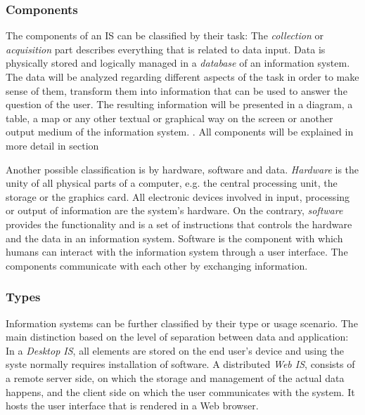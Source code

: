 \subsubsection{Components} %
\label{ssub:components_is}


The components of an IS can be classified by their task: The \emph{collection} or \emph{acquisition} part describes everything that is related to data input. Data is physically stored and logically managed in a \emph{database} of an information system. The data will be analyzed regarding different aspects of the task in order to make sense of them, transform them into information that can be used to answer the question of the user. The resulting information will be presented in a diagram, a table, a map or any other textual or graphical way on the screen or another output medium of the information system.
\cite{informationSystem}.
All components will be explained in more detail in section %

Another possible classification is by hardware, software and data. \emph{Hardware} is the unity of all physical parts of a computer, e.g. the central processing unit, the storage or the graphics card. All electronic devices involved in input, processing or output of information are the system's hardware. On the contrary, \emph{software} provides the functionality and is a set of instructions that controls the hardware and the data in an information system. Software is the component with which humans can interact with the information system through a user interface. The components communicate with each other by exchanging information.



\subsubsection{Types} %
\label{ssub:types}

Information systems can be further classified by their type or usage scenario. The main distinction based on the level of separation between data and application: In a \emph{Desktop IS}, all elements are stored on the end user's device and using the syste normally requires installation of software. A distributed \emph{Web IS}, consists of a remote server side, on which the storage and management of the actual data happens, and the client side on which the user communicates with the system. It hosts the user interface that is rendered in a Web browser.

